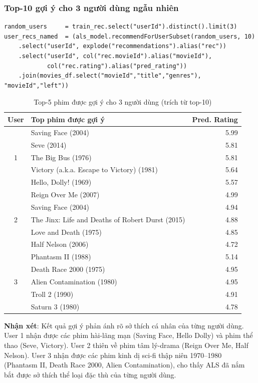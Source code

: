 \subsubsection{Top-10 gợi ý cho 3 người dùng ngẫu nhiên}

\begin{lstlisting}[style=PythonStyle, caption={Tạo gợi ý cho 3 user}]
random_users     = train_rec.select("userId").distinct().limit(3)
user_recs_named  = (als_model.recommendForUserSubset(random_users, 10)
    .select("userId", explode("recommendations").alias("rec"))
    .select("userId", col("rec.movieId").alias("movieId"),
            col("rec.rating").alias("pred_rating"))
    .join(movies_df.select("movieId","title","genres"), "movieId","left"))
\end{lstlisting}

\begin{table}[h]
\centering
\begin{tabular}{|c|l|r|}
\hline
\textbf{User} & \textbf{Top phim được gợi ý} & \textbf{Pred. Rating} \\
\hline
\multirow{5}{*}{1} & Saving Face (2004) & 5.99 \\
 & Seve (2014) & 5.81 \\
 & The Big Bus (1976) & 5.81 \\
 & Victory (a.k.a. Escape to Victory) (1981) & 5.64 \\
 & Hello, Dolly! (1969) & 5.57 \\
\hline
\multirow{5}{*}{2} & Reign Over Me (2007) & 4.99 \\
 & Saving Face (2004) & 4.94 \\
 & The Jinx: Life and Deaths of Robert Durst (2015) & 4.88 \\
 & Love and Death (1975) & 4.85 \\
 & Half Nelson (2006) & 4.72 \\
\hline
\multirow{5}{*}{3} & Phantasm II (1988) & 5.14 \\
 & Death Race 2000 (1975) & 4.95 \\
 & Alien Contamination (1980) & 4.95 \\
 & Troll 2 (1990) & 4.91 \\
 & Saturn 3 (1980) & 4.78 \\
\hline
\end{tabular}
\caption{Top-5 phim được gợi ý cho 3 người dùng (trích từ top-10)}
\end{table}

\textbf{Nhận xét}: Kết quả gợi ý phản ánh rõ sở thích cá nhân của từng người dùng. User 1 nhận được các phim hài-lãng mạn (Saving Face, Hello Dolly) và phim thể thao (Seve, Victory). User 2 thiên về phim tâm lý-drama (Reign Over Me, Half Nelson). User 3 nhận được các phim kinh dị sci-fi thập niên 1970--1980 (Phantasm II, Death Race 2000, Alien Contamination), cho thấy ALS đã nắm bắt được sở thích thể loại đặc thù của từng người dùng.
